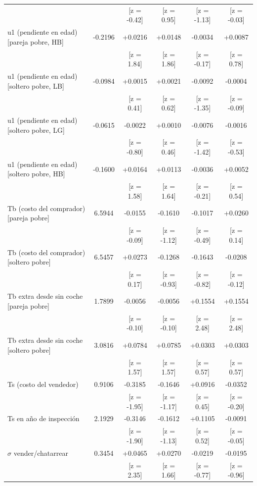 \begin{table}[htbp]
\begin{tabular}{lccccc}
 &  & [z = -0.42] & [z = 0.95] & [z = -1.13] & [z = -0.03] \\
u1 (pendiente en edad) [pareja pobre, HB] & -0.2196 & +0.0216 & +0.0148 & -0.0034 & +0.0087 \\
 &  & [z = 1.84] & [z = 1.86] & [z = -0.17] & [z = 0.78] \\
u1 (pendiente en edad) [soltero pobre, LB] & -0.0984 & +0.0015 & +0.0021 & -0.0092 & -0.0004 \\
 &  & [z = 0.41] & [z = 0.62] & [z = -1.35] & [z = -0.09] \\
u1 (pendiente en edad) [soltero pobre, LG] & -0.0615 & -0.0022 & +0.0010 & -0.0076 & -0.0016 \\
 &  & [z = -0.80] & [z = 0.46] & [z = -1.42] & [z = -0.53] \\
u1 (pendiente en edad) [soltero pobre, HB] & -0.1600 & +0.0164 & +0.0113 & -0.0036 & +0.0052 \\
 &  & [z = 1.58] & [z = 1.64] & [z = -0.21] & [z = 0.54] \\
Tb (costo del comprador) [pareja pobre] & 6.5944 & -0.0155 & -0.1610 & -0.1017 & +0.0260 \\
 &  & [z = -0.09] & [z = -1.12] & [z = -0.49] & [z = 0.14] \\
Tb (costo del comprador) [soltero pobre] & 6.5457 & +0.0273 & -0.1268 & -0.1643 & -0.0208 \\
 &  & [z = 0.17] & [z = -0.93] & [z = -0.82] & [z = -0.12] \\
Tb extra desde sin coche [pareja pobre] & 1.7899 & -0.0056 & -0.0056 & +0.1554 & +0.1554 \\
 &  & [z = -0.10] & [z = -0.10] & [z = 2.48] & [z = 2.48] \\
Tb extra desde sin coche [soltero pobre] & 3.0816 & +0.0784 & +0.0785 & +0.0303 & +0.0303 \\
 &  & [z = 1.57] & [z = 1.57] & [z = 0.57] & [z = 0.57] \\
Ts (costo del vendedor) & 0.9106 & -0.3185 & -0.1646 & +0.0916 & -0.0352 \\
 &  & [z = -1.95] & [z = -1.17] & [z = 0.45] & [z = -0.20] \\
Ts en año de inspección & 2.1929 & -0.3146 & -0.1612 & +0.1105 & -0.0091 \\
 &  & [z = -1.90] & [z = -1.13] & [z = 0.52] & [z = -0.05] \\
$\sigma$ vender/chatarrear & 0.3454 & +0.0465 & +0.0270 & -0.0219 & -0.0195 \\
 &  & [z = 2.35] & [z = 1.66] & [z = -0.77] & [z = -0.96] \\

\end{tabular}
\end{table}
